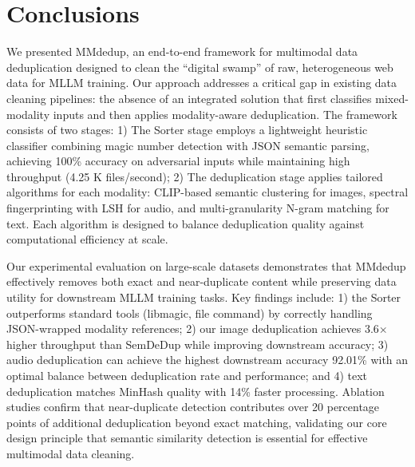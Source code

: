 \documentclass[sigconf, nonacm]{acmart}
\begin{document}

\section{Conclusions}
\label{sec:conclusion}

We presented MMdedup, an end-to-end framework for multimodal data deduplication designed to clean the ``digital swamp'' of raw, heterogeneous web data for MLLM training. Our approach addresses a critical gap in existing data cleaning pipelines: the absence of an integrated solution that first classifies mixed-modality inputs and then applies modality-aware deduplication. The framework consists of two stages: 1) The Sorter stage employs a lightweight heuristic classifier combining magic number detection with JSON semantic parsing, achieving 100\% accuracy on adversarial inputs while maintaining high throughput (4.25 K files/second); 2) The deduplication stage applies tailored algorithms for each modality: CLIP-based semantic clustering for images, spectral fingerprinting with LSH for audio, and multi-granularity N-gram matching for text. Each algorithm is designed to balance deduplication quality against computational efficiency at scale.

Our experimental evaluation on large-scale datasets demonstrates that MMdedup effectively removes both exact and near-duplicate content while preserving data utility for downstream MLLM training tasks. Key findings include: 1) the Sorter outperforms standard tools (libmagic, file command) by correctly handling JSON-wrapped modality references; 2) our image deduplication achieves 3.6$\times$ higher throughput than SemDeDup while improving downstream accuracy; 3) audio deduplication can achieve the highest downstream accuracy 92.01\% with an optimal balance between deduplication rate and performance; and 4) text deduplication matches MinHash quality with 14\% faster processing. Ablation studies confirm that near-duplicate detection contributes over 20 percentage points of additional deduplication beyond exact matching, validating our core design principle that semantic similarity detection is essential for effective multimodal data cleaning.
\end{document}
